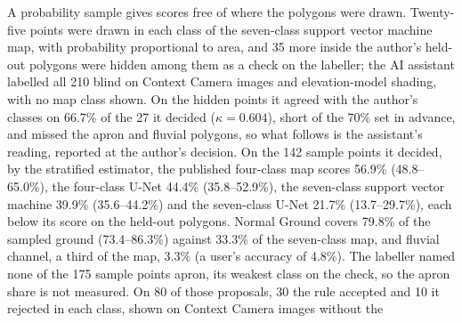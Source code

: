 A probability sample \citep{Olofsson2014} gives scores free of where the polygons were drawn. Twenty-five points were
drawn in each class of the seven-class support vector machine map, with probability proportional to area, and 35
more inside the author's held-out polygons were hidden among them as a check on the labeller; the AI assistant
labelled all 210 blind on Context Camera images and elevation-model shading, with no map class shown. On the hidden
points it agreed with the author's classes on 66.7\% of the 27 it decided ($\kappa=0.604$), short of the 70\% set in
advance, and missed the apron and fluvial polygons, so what follows is the assistant's reading, reported at the
author's decision. On the 142 sample points it decided, by the stratified estimator, the published four-class map
scores 56.9\% (48.8--65.0\%), the four-class U-Net 44.4\% (35.8--52.9\%), the seven-class support vector machine
39.9\% (35.6--44.2\%) and the seven-class U-Net 21.7\% (13.7--29.7\%), each below its score on the held-out polygons.
Normal Ground covers 79.8\% of the sampled ground (73.4--86.3\%) against 33.3\% of the seven-class map, and fluvial
channel, a third of the map, 3.3\% (a user's accuracy of 4.8\%). The labeller named none of the 175 sample points apron, its
weakest class on the check, so the apron share is not measured. %
On 80 of those proposals, 30 the rule accepted and 10 it rejected in each class, shown on Context Camera images without the

